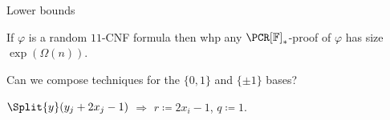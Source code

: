 \begin{frame}{Lower bounds}
    
    \begin{theorem}
        If $\varphi$ is a random $11$-CNF formula then whp any $\PCR[\field]_*$-proof of $\varphi$ has
        size $\exp(\Omega(n))$.
    \end{theorem}


    \pause

    Can we compose techniques for the $\{0, 1\}$ and $\{\pm 1\}$ bases?

    \pause
    
    

    $\Split{y}(y_j + 2 x_j - 1)$ \hspace{1.5cm} $\Rightarrow$ \hspace{1.5cm} $r \coloneqq 2 x_i - 1$, $q
    \coloneqq 1$.

\end{frame}


